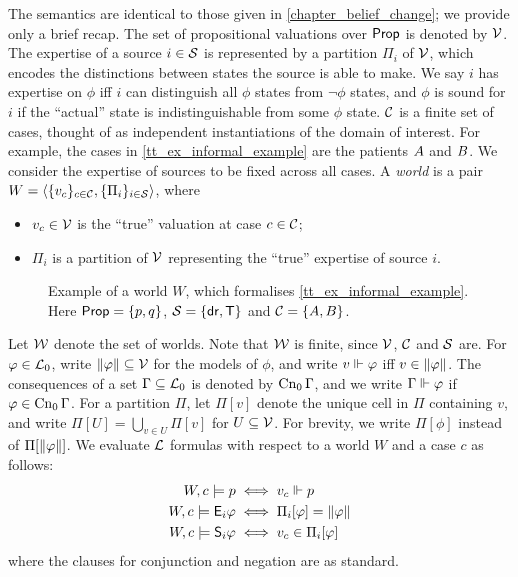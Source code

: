 The semantics are identical to those given in \cref{chapter_belief_change}; we
provide only a brief recap. The set of propositional valuations over
$\mathsf{Prop}$ is denoted by $\mathcal{V}$. The expertise of a source $i \in \mathcal{S}$ is
represented by a partition $\Pi_i$ of $\mathcal{V}$, which encodes the distinctions
between states the source is able to make. We say $i$ has expertise on $\phi$
iff $i$ can distinguish all $\phi$ states from $\neg\phi$ states, and $\phi$ is
sound for $i$ if the ``actual'' state is indistinguishable from some $\phi$
state. $\mathcal{C}$ is a finite set of cases, thought of as independent
instantiations of the domain of interest. For example, the cases in
\cref{tt_ex_informal_example} are the patients $A{}$ and $B{}$.
We consider the expertise of sources to be fixed across all cases.
%
A \emph{world} is a pair $W = \langle {\{v_c\}_{c \in \mathcal{C}},
\{\Pi_i\}_{i \in \mathcal{S}}} \rangle$, where
\begin{itemize}
    \item $v_c \in \mathcal{V}$ is the ``true'' valuation at case $c \in \mathcal{C}$;
    \item $\Pi_i$ is a partition of $\mathcal{V}$ representing the
          ``true'' expertise of source $i$.
\end{itemize}

\begin{figure}
    \centering
    
    \caption{
        Example of a world $W$, which formalises \cref{tt_ex_informal_example}.
        Here $\mathsf{Prop} = \{p, q\}$, $\mathcal{S} = \{\mathsf{dr}{}, \mathsf{T}{}\}$ and $\mathcal{C} =
        \{A{}, B{}\}$.
    }
    \label{tt_fig_example_world}
\end{figure}

Let $\mathcal{W}$ denote the set of worlds. Note that $\mathcal{W}$ is finite, since
$\mathcal{V}$, $\mathcal{C}$ and $\mathcal{S}$ are.
%
For $\varphi \in \mathcal{L}_0$, write $\|{\varphi}\| \subseteq \mathcal{V}$ for the
models of $\phi$, and write $v \Vdash \varphi$ iff $v \in \|{\varphi}\|$.
The consequences of a set $\Gamma \subseteq \mathcal{L}_0$ is denoted by
$\operatorname{Cn}_0{\Gamma}$, and we write $\Gamma \Vdash \varphi$ if $\varphi \in
\operatorname{Cn}_0{\Gamma}$.
%
For a partition $\Pi$, let $\Pi[v]$ denote the unique cell in $\Pi$ containing
$v$, and write $\Pi[U] = \bigcup_{v \in U}{\Pi[v]}$ for $U \subseteq
\mathcal{V}$. For brevity, we write $\Pi[\phi]$ instead of
$\Pi[\|{\varphi}\|]$. We evaluate $\mathcal{L}$ formulas with respect to a world $W$
and a case $c$ as follows:
\begin{align*}
    W, c \models p &\iff v_c \Vdash p \\
    W, c \models \mathsf{E}_i\varphi &\iff \Pi_i[\varphi] = \|{\varphi}\| \\
    W, c \models \mathsf{S}_i\varphi &\iff v_c \in \Pi_i[\varphi]
\end{align*}
where the clauses for conjunction and negation are as standard.

